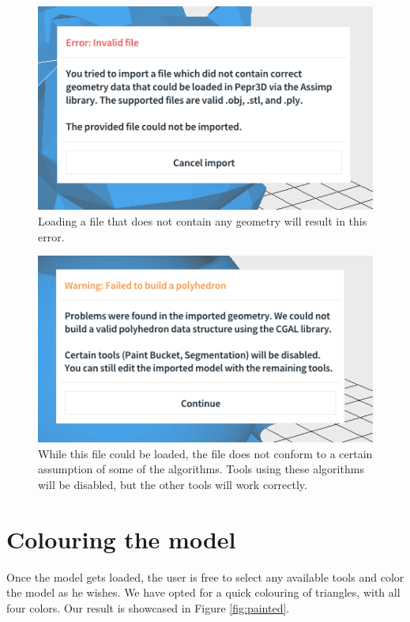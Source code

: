 \begin{figure}
	\centering
	\includegraphics[scale=0.9]{images/invalid_file.png}
	\caption{Loading a file that does not contain any geometry will result in this error.}
	\label{fig:invalidfile}
\end{figure}

\begin{figure}
	\centering
	\includegraphics[scale=0.9]{images/polyhedron_failed.png}
	\caption{While this file could be loaded, the file does not conform to a certain assumption of some of the algorithms. Tools using these algorithms will be disabled, but the other tools will work correctly.}
	\label{fig:polyhedronfailed}
\end{figure}

\section{Colouring the model}

Once the model gets loaded, the user is free to select any available tools and color the model as he wishes. We have opted for a quick colouring of triangles, with all four colors. Our result is showcased in Figure \ref{fig:painted}.


